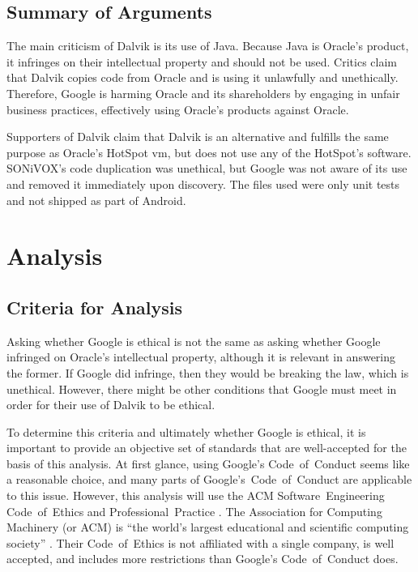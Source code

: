 \documentclass[11pt]{article}
\begin{document}
\begin{multicols}{2}


\subsection{Summary of Arguments} %
\label{sub:args-summary}

The main criticism of Dalvik is its use of Java.  Because Java is Oracle's
product, it infringes on their intellectual property and should not be used.
Critics claim that Dalvik copies code from Oracle and is using it unlawfully and
unethically.  Therefore, Google is harming Oracle and its shareholders by
engaging in unfair business practices, effectively using Oracle's products
against Oracle.

Supporters of Dalvik claim that Dalvik is an alternative and fulfills the same
purpose as Oracle's HotSpot \gls{vm}, but does not use any of the HotSpot's
software.  SONiVOX's code duplication was unethical, but Google was not aware of
its use and removed it immediately upon discovery.  The files used were only
unit tests and not shipped as part of Android.



\section{Analysis} %
\label{sec:analysis}

\subsection{Criteria for Analysis} %
\label{sub:criteria}

Asking whether Google is ethical is not the same as asking whether Google
infringed on Oracle's intellectual property, although it is relevant in
answering the former.  If Google did infringe, then they would be breaking the
law, which is unethical.  However, there might be other conditions that Google
must meet in order for their use of Dalvik to be ethical.

To determine this criteria and ultimately whether Google is ethical, it is
important to provide an objective set of standards that are well-accepted for
the basis of this analysis.  At first glance, using Google's Code~of~Conduct
\cite{google-conduct} seems like a reasonable choice, and many parts of
Google's~Code~of~Conduct are applicable to this issue.  However, this analysis
will use the ACM Software~Engineering Code~of~Ethics and Professional~Practice
\cite{secode}.  The Association for Computing Machinery (or ACM) is ``the
world's largest educational and scientific computing society'' \cite{acm}.
Their Code~of~Ethics is not affiliated with a single company, is well accepted,
and includes more restrictions than Google's Code~of~Conduct does.


\end{multicols}
\end{document}
